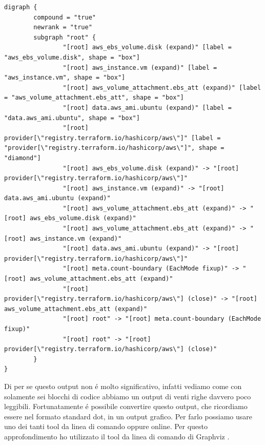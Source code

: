 \documentclass[12pt, a4paper, titlepage]{article}
\newenvironment{code}{\captionsetup{type=listing}}{}
\begin{document}
\begin{code}
	\begin{verbatim}
digraph {
        compound = "true"
        newrank = "true"
        subgraph "root" {
                "[root] aws_ebs_volume.disk (expand)" [label = "aws_ebs_volume.disk", shape = "box"]
                "[root] aws_instance.vm (expand)" [label = "aws_instance.vm", shape = "box"]
                "[root] aws_volume_attachment.ebs_att (expand)" [label = "aws_volume_attachment.ebs_att", shape = "box"]
                "[root] data.aws_ami.ubuntu (expand)" [label = "data.aws_ami.ubuntu", shape = "box"]
                "[root] provider[\"registry.terraform.io/hashicorp/aws\"]" [label = "provider[\"registry.terraform.io/hashicorp/aws\"]", shape = "diamond"]
                "[root] aws_ebs_volume.disk (expand)" -> "[root] provider[\"registry.terraform.io/hashicorp/aws\"]"
                "[root] aws_instance.vm (expand)" -> "[root] data.aws_ami.ubuntu (expand)"
                "[root] aws_volume_attachment.ebs_att (expand)" -> "[root] aws_ebs_volume.disk (expand)"
                "[root] aws_volume_attachment.ebs_att (expand)" -> "[root] aws_instance.vm (expand)"
                "[root] data.aws_ami.ubuntu (expand)" -> "[root] provider[\"registry.terraform.io/hashicorp/aws\"]"
                "[root] meta.count-boundary (EachMode fixup)" -> "[root] aws_volume_attachment.ebs_att (expand)"
                "[root] provider[\"registry.terraform.io/hashicorp/aws\"] (close)" -> "[root] aws_volume_attachment.ebs_att (expand)"
                "[root] root" -> "[root] meta.count-boundary (EachMode fixup)"
                "[root] root" -> "[root] provider[\"registry.terraform.io/hashicorp/aws\"] (close)"
        }
}
	\end{verbatim}
\end{code}
\bigskip

Di per se questo output non é molto significativo, infatti vediamo come con solamente sei blocchi di codice abbiamo un output di venti righe davvero poco leggibili. Fortunatamente é possibile convertire questo output, che ricordiamo essere nel formato standard \gls{dot}, in un output grafico. Per farlo possiamo usare uno dei tanti tool da linea di comando oppure online. Per questo approfondimento ho utilizzato il tool da linea di comando di Graphviz \cite{graphviz}.
\end{document}
